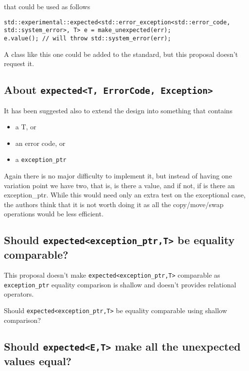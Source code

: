 \documentclass[a4paper,10pt]{article}
\newcommand{\cpp}[1]{\lstinline{#1}}
\begin{document}
\noindent
that could be used as follows

\begin{lstlisting}
std::experimental::expected<std::error_exception<std::error_code, std::system_error>, T> e = make_unexpected(err);
e.value(); // will throw std::system_error(err);
\end{lstlisting}

A class like this one could be added to the standard, but this proposal doesn't request it. 

\subsection{About \cpp{expected<T, ErrorCode, Exception>}}

It has been suggested also to extend the design into something that contains 

\begin{itemize}
\item a T, or
\item an error code, or
\item a \cpp{exception_ptr} 
\end{itemize}

Again there is no major difficulty to implement it, but instead of having one variation point we have two, that is, is there a value, and if not, if is there an exception_ptr. While this would need only an extra test on the exceptional case, the authors think that it is not worth doing it as all the copy/move/swap operations would be less efficient. 

\subsection{Should \cpp{expected<exception_ptr,T>} be equality comparable?}

This proposal doesn't make \cpp{expected<exception_ptr,T>} comparable as \cpp{exception_ptr} equality comparison is shallow and doesn't provides relational operators.

Should \cpp{expected<exception_ptr,T>} be equality comparable using shallow comparison?

\subsection{Should \cpp{expected<E,T>} make all the unexpected values equal?}
\end{document}
